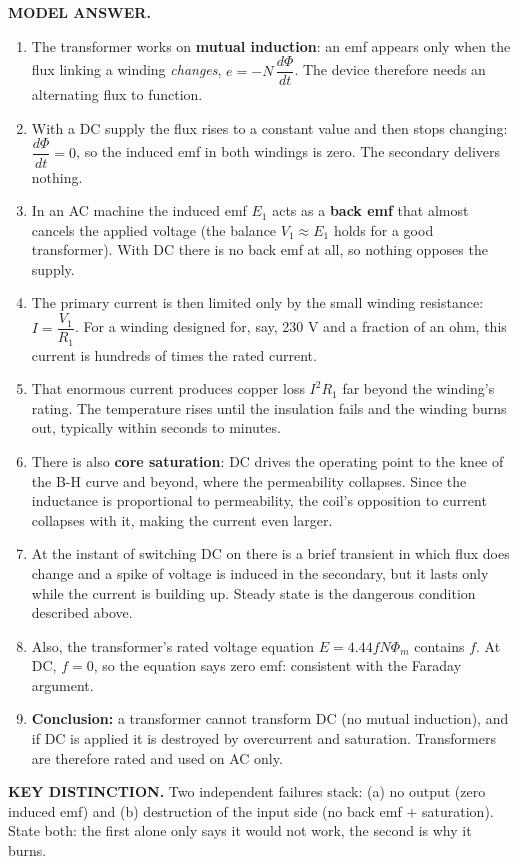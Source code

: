 \documentclass[11pt]{article}
\newcommand{\tagline}[1]{\textbf{\color{copper}#1}}
\newcommand{\keydist}[1]{\vspace{2pt}\textbf{\color{red}KEY DISTINCTION.} #1}
\begin{document}
\tagline{MODEL ANSWER.}
\begin{enumerate}[label=\arabic*.]
\item The transformer works on \textbf{mutual induction}: an emf appears only when the flux linking a winding \emph{changes}, $e = -N\,\dfrac{d\Phi}{dt}$. The device therefore needs an alternating flux to function.
\item With a DC supply the flux rises to a constant value and then stops changing: $\dfrac{d\Phi}{dt} = 0$, so the induced emf in both windings is zero. The secondary delivers nothing.
\item In an AC machine the induced emf $E_1$ acts as a \textbf{back emf} that almost cancels the applied voltage (the balance $V_1 \approx E_1$ holds for a good transformer). With DC there is no back emf at all, so nothing opposes the supply.
\item The primary current is then limited only by the small winding resistance: $I = \dfrac{V_1}{R_1}$. For a winding designed for, say, 230 V and a fraction of an ohm, this current is hundreds of times the rated current.
\item That enormous current produces copper loss $I^2 R_1$ far beyond the winding's rating. The temperature rises until the insulation fails and the winding burns out, typically within seconds to minutes.
\item There is also \textbf{core saturation}: DC drives the operating point to the knee of the B-H curve and beyond, where the permeability collapses. Since the inductance is proportional to permeability, the coil's opposition to current collapses with it, making the current even larger.
\item At the instant of switching DC on there is a brief transient in which flux does change and a spike of voltage is induced in the secondary, but it lasts only while the current is building up. Steady state is the dangerous condition described above.
\item Also, the transformer's rated voltage equation $E = 4.44 f N \Phi_m$ contains $f$. At DC, $f = 0$, so the equation says zero emf: consistent with the Faraday argument.
\item \textbf{Conclusion:} a transformer cannot transform DC (no mutual induction), and if DC is applied it is destroyed by overcurrent and saturation. Transformers are therefore rated and used on AC only.
\end{enumerate}

\keydist{Two independent failures stack: (a) no output (zero induced emf) and (b) destruction of the input side (no back emf $+$ saturation). State both: the first alone only says it would not work, the second is why it burns.}
\end{document}
